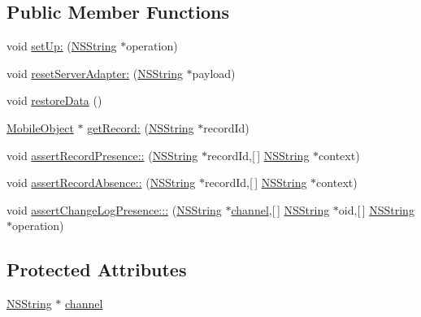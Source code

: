 \subsection*{\-Public \-Member \-Functions}
\begin{DoxyCompactItemize}
\item 
void \hyperlink{interface_abstract_integration_test_a20080f1b58ea40ef1754d2a350678159}{set\-Up\-:} (\hyperlink{class_n_s_string}{\-N\-S\-String} $\ast$operation)
\item 
void \hyperlink{interface_abstract_integration_test_ac5932549ea8dcbee3c8508083bac3bca}{reset\-Server\-Adapter\-:} (\hyperlink{class_n_s_string}{\-N\-S\-String} $\ast$payload)
\item 
void \hyperlink{interface_abstract_integration_test_ae5e42a89975dc51296b13bfd75abbba9}{restore\-Data} ()
\item 
\hyperlink{interface_mobile_object}{\-Mobile\-Object} $\ast$ \hyperlink{interface_abstract_integration_test_a60b4d2880b6ca512131f9c89eae5871d}{get\-Record\-:} (\hyperlink{class_n_s_string}{\-N\-S\-String} $\ast$record\-Id)
\item 
void \hyperlink{interface_abstract_integration_test_ab1e1b03aa7487775ea7a2ba371cfec99}{assert\-Record\-Presence\-::} (\hyperlink{class_n_s_string}{\-N\-S\-String} $\ast$record\-Id,\mbox{[}$\,$\mbox{]} \hyperlink{class_n_s_string}{\-N\-S\-String} $\ast$context)
\item 
void \hyperlink{interface_abstract_integration_test_a7a3b5fe02a54bcdba619fe1ea66f07c3}{assert\-Record\-Absence\-::} (\hyperlink{class_n_s_string}{\-N\-S\-String} $\ast$record\-Id,\mbox{[}$\,$\mbox{]} \hyperlink{class_n_s_string}{\-N\-S\-String} $\ast$context)
\item 
void \hyperlink{interface_abstract_integration_test_aefd339da38f098c1e4e5bc22ab9f3e36}{assert\-Change\-Log\-Presence\-:::} (\hyperlink{class_n_s_string}{\-N\-S\-String} $\ast$\hyperlink{interface_abstract_integration_test_a9b68202e805cadd80325dfcd2d543f0a}{channel},\mbox{[}$\,$\mbox{]} \hyperlink{class_n_s_string}{\-N\-S\-String} $\ast$oid,\mbox{[}$\,$\mbox{]} \hyperlink{class_n_s_string}{\-N\-S\-String} $\ast$operation)
\end{DoxyCompactItemize}
\subsection*{\-Protected \-Attributes}
\begin{DoxyCompactItemize}
\item 
\hyperlink{class_n_s_string}{\-N\-S\-String} $\ast$ \hyperlink{interface_abstract_integration_test_a9b68202e805cadd80325dfcd2d543f0a}{channel}
\end{DoxyCompactItemize}


